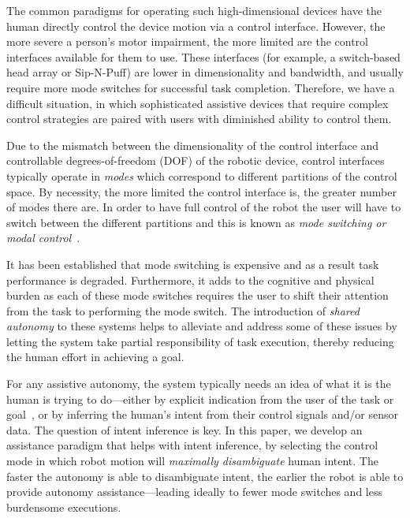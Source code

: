 \documentclass[conference]{IEEEtran}
\begin{document}
The common paradigms for operating such high-dimensional devices have the human directly control the device motion via a control interface. However, the more severe a person's motor impairment, the more limited are the control interfaces available for them to use. These interfaces (for example, a switch-based head array or Sip-N-Puff) are lower in dimensionality and bandwidth, and usually require more mode switches for successful task completion. Therefore, we have a difficult situation, in which sophisticated assistive devices that require complex control strategies are paired with users with diminished ability to control them.

Due to the mismatch between the dimensionality of the control interface and controllable degrees-of-freedom (DOF) of the robotic device, control interfaces typically operate in \textit{modes} which correspond to different partitions of the control space. By necessity, the more limited the control interface is, the greater number of modes there are. In order to have full control of the robot the user will have to switch between the different partitions and this is known as \textit{mode switching or modal control}~\cite{tsui2008development, nuttin2002selection}. 

It has been established that mode switching is expensive and as a result task performance is degraded. Furthermore, it adds to the cognitive and physical burden as each of these mode switches requires the user to shift their attention from the task to performing the mode switch. The introduction of \textit{shared autonomy} to these systems helps to alleviate and address some of these issues by letting the system take partial responsibility of task execution, thereby reducing the human effort in achieving a goal. 

For any assistive autonomy, the system typically needs an idea of what it is the human is trying to do---either by explicit indication from the user of the task or goal~\cite{choi2008laser}, or by inferring the human's intent from their control signals and/or sensor data. The question of intent inference is key. In this paper, we develop an assistance paradigm that helps with intent inference, by selecting the control mode in which robot motion will \textit{maximally disambiguate} human intent. The faster the autonomy is able to disambiguate intent, the earlier the robot is able to provide autonomy assistance---leading ideally to fewer mode switches and less burdensome executions. 
\end{document}
